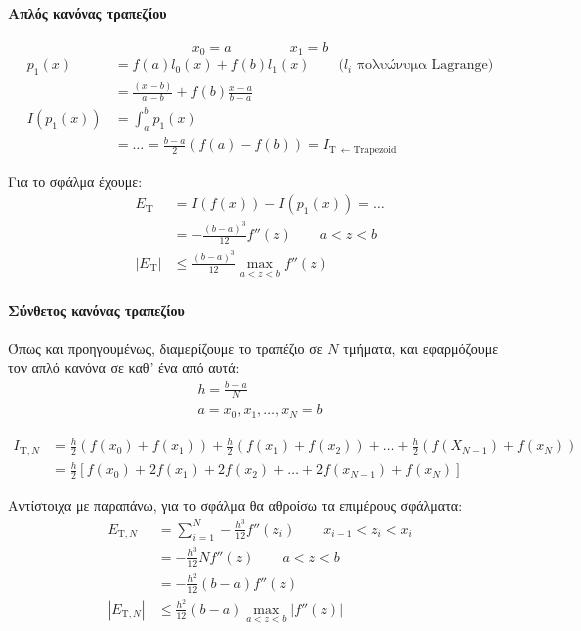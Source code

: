 \documentclass[11pt,a4paper,notitlepage,fleqn,final]{article}
\begin{document}
    \paragraph{Απλός κανόνας τραπεζίου}

    \[x_0 = a \hspace{50pt} x_1=b \]
    \begin{align*}
    	p_1(x) &= f(a)l_0(x) + f(b)l_1(x) \qquad
    	\text{($l_i$ πολυώνυμα Lagrange)} \\
    	&= \frac{(x-b)}{a-b} + f(b)\frac{x-a}{b-a} \\
    	I\left(p_1(x)\right) &= \int_{a}^{b} p_1(x)
    	\\ &= \dots = \frac{b-a}{2}\left(f(a)-f(b)\right) =
    	I_{\mathrm T \ \leftarrow \text{Trapezoid}}
    \end{align*}

    Για το σφάλμα έχουμε:
    \begin{align*}
    	E_{\mathrm T} &= I\left(f(x)\right) - I\left(p_1(x)\right)
    	= \dots \\ &=
    	-\frac{(b-a)^3}{12}f''(z) \qquad a<z<b \\
    	\left|E_{\mathrm T}\right| &\leq \frac{(b-a)^3}{12}
    	\max_{a<z<b} f''(z)
    \end{align*}

    \paragraph{Σύνθετος κανόνας τραπεζίου}
    Όπως και προηγουμένως, διαμερίζουμε το τραπέζιο σε \( N \) τμήματα,
    και εφαρμόζουμε τον απλό κανόνα σε καθ' ένα από αυτά:
    \begin{gather*}
    	h = \frac{b-a}{N} \\
    	a = x_0,x_1,\dots,x_N=b
    \end{gather*}

    \begin{align*}
    	I_{\mathrm T,N} &= \frac{h}{2} \left(f(x_0)+f(x_1)\right)
    	+ \frac{h}{2} \left(f(x_1)+f(x_2)\right) + \dots + \frac{h}{2}
    	\left(f(X_{N-1})+f(x_N)\right)
    	\\ &= \frac{h}{2} \left[
    	f(x_0)+2f(x_1)+2f(x_2)+\dots+2f(x_{N-1})+f(x_N)
    	\right]
    \end{align*}

    Αντίστοιχα με παραπάνω, για το σφάλμα θα αθροίσω τα επιμέρους
    σφάλματα:
    \begin{align*}
    	E_{\mathrm T,N} &= \sum_{i=1}^{N} -\frac{h^3}{12} f''(z_i)
    	\qquad x_{i-1} < z_i < x_i
    	\\ &= - \frac{h^3}{12} N f''(z) \qquad a<z<b
    	\\ &= -\frac{h^2}{12}(b-a)f''(z) \\
    	|E_{\mathrm T,N}| &\leq \frac{h^2}{12}(b-a)\max_{a<z<b}
    	\left|f''(z)\right|
    \end{align*}
\end{document}
